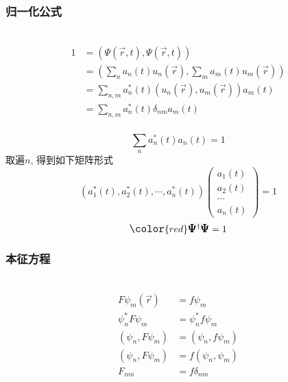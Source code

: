 \begin{frame} 
    \frametitle{归一化公式}
    \解~ 
    \begin{equation*}
        \begin{split}
            1 &=(\Psi(\vec{r},t), \Psi(\vec{r},t)) \\
            &= (\sum_n a_n(t) u_n(\vec{r}), \sum_m a_m(t) u_m(\vec{r}))\\
            &= \sum_{n,m} a_n ^*(t) (u_n(\vec{r}), u_m(\vec{r})) a_m(t)\\
            &= \sum_{n,m} a_n ^*(t) \delta_{nm} a_m(t)\\
        \end{split} 
    \end{equation*}
\end{frame}


\begin{frame} 
    $$  \sum_{n} a_n ^*(t) a_n(t) =1 $$
    取遍$n$, 得到如下矩阵形式\\
    $$ (a_1 ^*(t), a_2 ^*(t),\cdots,a_n^*(t) )
    \begin{pmatrix}
        a_1(t)\\
        a_2(t)\\
        \cdots \\
        a_n(t)
    \end{pmatrix}
    =1 $$ \vspace{1.0em} 
    $$ \large \color{red} \pmb {\Psi} ^{\dagger } \pmb {\Psi} =1 $$

\end{frame}

\begin{frame} 
    \frametitle{本征方程}
    \解~ 
    \begin{equation*}
        \begin{split}
            F\psi_m (\vec{r}) &=f \psi_m \\
            \psi_n ^*  F\psi_m &=\psi_n ^* f \psi_m\\
            (\psi_n, F\psi_m )&=(\psi_n, f \psi_m)\\
            (\psi_n, F\psi_m )&=f(\psi_n, \psi_m)\\
            F_{nm} &=f \delta_{nm}
        \end{split} 
    \end{equation*}
\end{frame}

